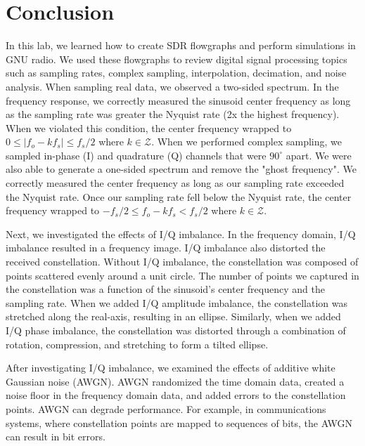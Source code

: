 \documentclass{article}
\begin{document}
\section{Conclusion}

In this lab, we learned how to create SDR flowgraphs and perform simulations in GNU radio. We used these flowgraphs to review digital signal processing topics such as sampling rates, complex sampling, interpolation, decimation, and noise analysis. When sampling real data, we observed a two-sided spectrum. In the frequency response, we correctly measured the sinusoid center frequency as long as the sampling rate was greater the Nyquist rate (2x the highest frequency). When we violated this condition, the center frequency wrapped to $0 \leq |f_o - kf_s| \leq f_s/2$ where $k \in \mathcal{Z}$. When we performed complex sampling, we sampled in-phase (I) and quadrature (Q) channels that were $90^\circ$ apart. We were also able to generate a one-sided spectrum and remove the "ghost frequency". We correctly measured the center frequency as long as our sampling rate exceeded the Nyquist rate. Once our sampling rate fell below the Nyquist rate, the center frequency wrapped to $-f_s/2 \leq f_o - kf_s < f_s/2$ where $k \in \mathcal{Z}$.

Next, we investigated the effects of I/Q imbalance. In the frequency domain, I/Q imbalance resulted in a frequency image. I/Q imbalance also distorted the received constellation. Without I/Q imbalance, the constellation was composed of points scattered evenly around a unit circle. The number of points we captured in the constellation was a function of the sinusoid's center frequency and the sampling rate. When we added I/Q amplitude imbalance, the constellation was stretched along the real-axis, resulting in an ellipse. Similarly, when we added I/Q phase imbalance, the constellation was distorted through a combination of rotation, compression, and stretching to form a tilted ellipse.

After investigating I/Q imbalance, we examined the effects of additive white Gaussian noise (AWGN). AWGN randomized the time domain data, created a noise floor in the frequency domain data, and added errors to the constellation points. AWGN can degrade performance. For example, in communications systems, where constellation points are mapped to sequences of bits, the AWGN can result in bit errors.
\end{document}

